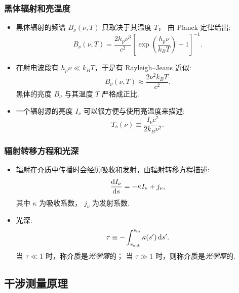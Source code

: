 \documentclass{beamer}
\begin{document}
\begin{frame}[subsec]
  \frametitle{黑体辐射和亮温度}
  \begin{itemize}
    \item \alert{黑体辐射}的频谱 $B_{\nu}(\nu, T)$ 只取决于其温度 $T$，
      由 \alert{Planck 定律}给出:
      \begin{equation}
        B_{\nu}(\nu, T) =
          \frac{2 h_p \nu^3}{c^2} \left[ \exp\left(
            \frac{h_p \nu}{k_B T} \right) - 1 \right]^{-1} .
      \end{equation}
    \item 在射电波段有 $h_p \nu \ll k_B T$，于是有 \alert{Rayleigh--Jeans 近似}:
      \begin{equation}
        B_{\nu}(\nu, T) \approx \frac{2 \nu^2 k_B T}{c^2} .
      \end{equation}
      黑体的亮度 $B_{\nu}$ 与其温度 $T$ 严格成正比.
    \item 一个辐射源的亮度 $I_{\nu}$ 可以很方便与使用\alert{亮温度}来描述:
      \begin{equation}
        T_b(\nu) \equiv \frac{I_{\nu} c^2}{2 k_B \nu^2} .
      \end{equation}
  \end{itemize}
\end{frame}

\begin{frame}[subsec]
  \frametitle{辐射转移方程和光深}
  \begin{itemize}
    \item 辐射在介质中传播时会经历吸收和发射，由\alert{辐射转移方程}描述:
      \begin{equation}
        \frac{\text{d}I_{\nu}}{\text{d}s} = -\kappa I_{\nu} + j_{\nu} ,
      \end{equation}
      其中 $\kappa$ 为吸收系数， $j_{\nu}$ 为发射系数.
    \item \alert{光深}:
      \begin{equation}
        \tau \equiv
          - \int_{s_{\text{out}}}^{s_{\text{in}}} \kappa(s') \,\text{d}s' .
      \end{equation}
      当 $\tau \ll 1$ 时，称介质是\emph{光学薄}的；
      当 $\tau \gg 1$ 时，则称介质是\emph{光学厚}的.
  \end{itemize}
\end{frame}

\subsection{干涉测量原理}
\end{document}
